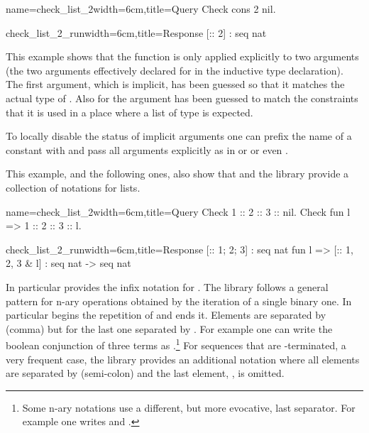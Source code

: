 \begin{coq}{name=check_list_2}{width=6cm,title=Query}
Check cons 2 nil.
\end{coq}
\begin{coqout}{check_list_2_run}{width=6cm,title=Response}
[:: 2] : seq nat
\end{coqout}
\index[coq]{\C{(_ :: _)}}
This example shows that the function  is only applied
explicitly to two arguments (the two arguments effectively declared
for  in the inductive type declaration).
The first argument, which is implicit,
has been guessed so that it matches the actual type of .  Also for
 the argument has been guessed to match the constraints
that it is used in a place where a list of type  is expected.

To locally disable the
status of implicit arguments one can prefix the name of a
constant with  and pass all arguments explicitly as in
 or  or even
.

This example, and the following ones, also show
that \Coq{} and the \mcbMC{} library provide
a collection of notations for lists.

\begin{coq}{name=check_list_2}{width=6cm,title=Query}
Check 1 :: 2 :: 3 :: nil.
Check fun l => 1 :: 2 :: 3 :: l.
$~$
\end{coq}
\begin{coqout}{check_list_2_run}{width=6cm,title=Response}
[:: 1; 2; 3] : seq nat
fun l => [:: 1, 2, 3 & l]
  : seq nat -> seq nat
\end{coqout}
\index[coq]{\C{[:: .. , .. & ..]}}

In particular \Coq{} provides the infix notation \C{::} for
.  The \mcbMC{} library follows a general pattern for
n-ary operations obtained by the iteration of a single binary one. In
particular \C{[::} begins the repetition
of \C{::} and \C{]} ends it.  Elements are separated by \C{,} (comma)
but for the last one separated by \C{&}.
For example one
can write  the boolean conjunction
of three terms as .\footnote{Some n-ary
  notations use a different, but more evocative, last separator.  For
  example one writes \C{[|| b1, b2 | b3]} and \C{[==> b1, b2 => b3]}.}
\index[coq]{\C{["|"| .. , .. "| ..]}}
\index[coq]{\C{[&& .. , .. & ..]}}
\index[coq]{\C{[==> .. , .. => ..]}}
For sequences that are -terminated, a very frequent case,
the \mcbMC{} library provides an additional notation where all elements are
separated by \C{;} (semi-colon) and the last element, ,
is omitted.
\index[coq]{\C{[seq .. ; ..]}}

